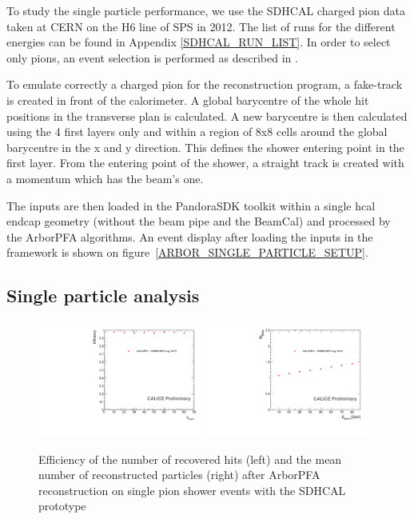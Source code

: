\documentclass[cits]{JINST}
\begin{document}
To study the single particle performance, we use the SDHCAL charged pion data taken at CERN on the H6 line of SPS in 2012. The list of runs for the different energies can be found in Appendix \ref{SDHCAL_RUN_LIST}. In order to select only pions, an event selection is performed as described in \cite{sdhcal-paper}.

To emulate correctly a charged pion for the reconstruction program, a fake-track is created in front of the calorimeter. A global barycentre of the whole hit positions in the transverse plan is calculated. A new barycentre is then calculated using the 4 first layers only and within a region of 8x8 cells around the global barycentre in the x and y direction. This defines the shower entering point in the first layer. From the entering point of the shower, a straight track is created with a momentum which has the beam's one.

The inputs are then loaded in the PandoraSDK toolkit \cite{pandora-sdk} within a single hcal endcap geometry (without the beam pipe and the BeamCal) and processed by the ArborPFA algorithms. An event display after loading the inputs in the framework is shown on figure~\ref{ARBOR_SINGLE_PARTICLE_SETUP}.

\subsection{Single particle analysis}

\begin{figure}[!h]
  \begin{center}
    \includegraphics[width=0.48\textwidth]{plots/SingleParticle_Efficiency.pdf}
    \includegraphics[width=0.48\textwidth]{plots/SingleParticle_NPfos.pdf} \\
  \end{center}
  \caption{\label{ARBOR_SINGLE_PARTICLE_EFFICIENCY_AND_NPFOS} Efficiency of the number of recovered hits (left) and the mean number of reconstructed particles (right) after ArborPFA reconstruction on single pion shower events with the SDHCAL prototype}
\end{figure}
\end{document}
